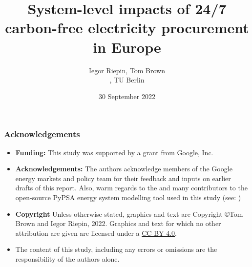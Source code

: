 

\title{System-level impacts of 24/7 carbon-free electricity procurement in Europe}

\author{
  Iegor Riepin, Tom Brown\\
  , TU Berlin
}

\date{30 September 2022}





\maketitle



\begin{frame}
  \frametitle{Acknowledgements}

  \begin{itemize}
    \item {\bf Funding:} This study was supported by a grant from Google, Inc. 
    \item {\bf Acknowledgements:} The authors acknowledge members of the Google energy markets and policy team 
    for their feedback and inputs on earlier drafts of this report. 
    Also, warm regards to the  and many contributors to the open-source 
    PyPSA energy system modelling tool used in this study (see: )
    \item 
    {\bf Copyright} Unless otherwise stated, graphics and text are Copyright \copyright Tom Brown and Iegor Riepin, 2022.
    Graphics and text for which no other attribution are given are licensed under a 
    \href{https://creativecommons.org/licenses/by/4.0/}{CC BY 4.0}.  {\footnotesize \ccby} 
    \item The content of this study, including any errors or omissions are the responsibility
    of the authors alone.
  \end{itemize}

\end{frame}


